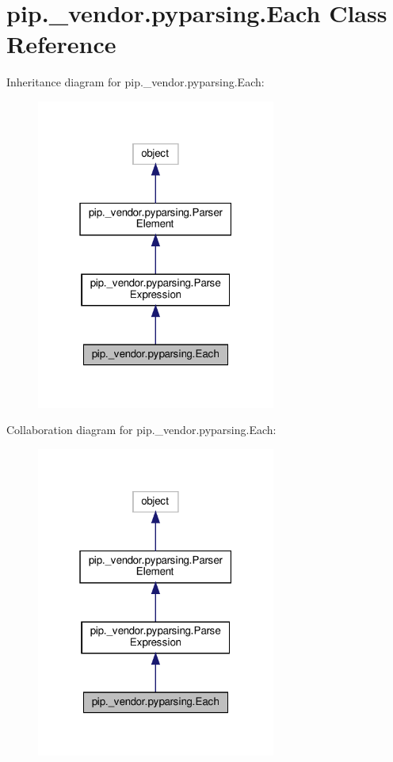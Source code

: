 \hypertarget{classpip_1_1__vendor_1_1pyparsing_1_1Each}{}\section{pip.\+\_\+vendor.\+pyparsing.\+Each Class Reference}
\label{classpip_1_1__vendor_1_1pyparsing_1_1Each}


Inheritance diagram for pip.\+\_\+vendor.\+pyparsing.\+Each\+:
\nopagebreak
\begin{figure}[H]
\begin{center}
\leavevmode
\includegraphics[width=223pt]{classpip_1_1__vendor_1_1pyparsing_1_1Each__inherit__graph}
\end{center}
\end{figure}


Collaboration diagram for pip.\+\_\+vendor.\+pyparsing.\+Each\+:
\nopagebreak
\begin{figure}[H]
\begin{center}
\leavevmode
\includegraphics[width=223pt]{classpip_1_1__vendor_1_1pyparsing_1_1Each__coll__graph}
\end{center}
\end{figure}
